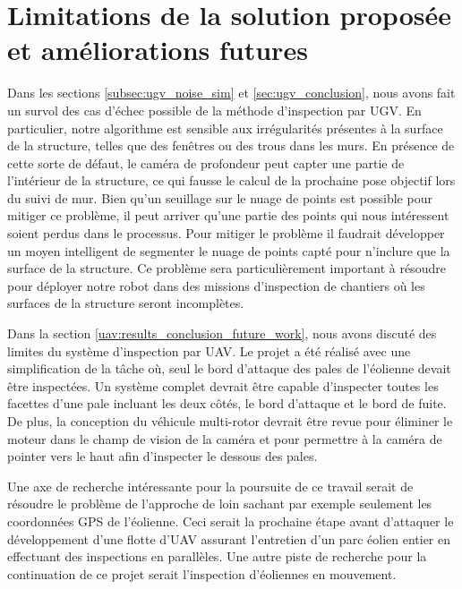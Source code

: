 \section{Limitations de la solution proposée et améliorations futures}\label{sec:Limitations}

Dans les sections \ref{subsec:ugv_noise_sim} et \ref{sec:ugv_conclusion}, nous avons fait un survol des cas d'échec possible de la méthode d'inspection par UGV. En particulier, notre algorithme est sensible aux irrégularités présentes à la surface de la structure, telles que des fenêtres ou des trous dans les murs. En présence de cette sorte de défaut, le caméra de profondeur peut capter une partie de l'intérieur de la structure, ce qui fausse le calcul de la prochaine pose objectif lors du suivi de mur. Bien qu'un seuillage sur le nuage de points est possible pour mitiger ce problème, il peut arriver qu'une partie des points qui nous intéressent soient perdus dans le processus. Pour mitiger le problème il faudrait développer un moyen intelligent de segmenter le nuage de points capté pour n'inclure que la surface de la structure. Ce problème sera particulièrement important à résoudre pour déployer notre robot dans des missions d'inspection de chantiers où les surfaces de la structure seront incomplètes. 

Dans la section \ref{uav:results_conclusion_future_work}, nous avons discuté des limites du système d'inspection par UAV. Le projet a été réalisé avec une simplification de la tâche où, seul le bord d'attaque des pales de l'éolienne devait être inspectées. Un système complet devrait être capable d'inspecter toutes les facettes d'une pale incluant les deux côtés, le bord d'attaque et le bord de fuite. De plus, la conception du véhicule multi-rotor devrait être revue pour éliminer le moteur dans le champ de vision de la caméra et pour permettre à la caméra de pointer vers le haut afin d'inspecter le dessous des pales. 

Une axe de recherche intéressante pour la poursuite de ce travail serait de résoudre le problème de l'approche de loin sachant par exemple seulement les coordonnées GPS de l'éolienne. Ceci serait la prochaine étape avant d'attaquer le développement d'une flotte d'UAV assurant l'entretien d'un parc éolien entier en effectuant des inspections en parallèles. Une autre piste de recherche pour la continuation de ce projet serait l'inspection d'éoliennes en mouvement.

